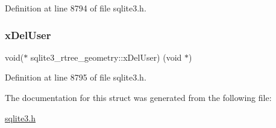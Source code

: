 Definition at line 8794 of file sqlite3.\+h.

\mbox{\label{structsqlite3__rtree__geometry_ae9835a39924a75b33cce9f6b10e1813f}} 
\subsubsection{\texorpdfstring{x\+Del\+User}{xDelUser}}
{\footnotesize\ttfamily void($\ast$ sqlite3\+\_\+rtree\+\_\+geometry\+::x\+Del\+User) (void $\ast$)}



Definition at line 8795 of file sqlite3.\+h.



The documentation for this struct was generated from the following file\+:\begin{DoxyCompactItemize}
\item 
\mbox{\hyperlink{sqlite3_8h}{sqlite3.\+h}}\end{DoxyCompactItemize}

